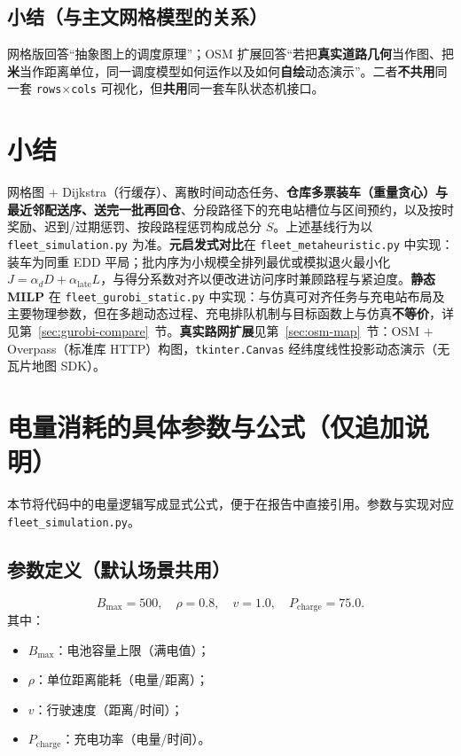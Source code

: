 \documentclass[UTF8,a4paper]{ctexart}
\begin{document}
\subsection{小结（与主文网格模型的关系）}

网格版回答“抽象图上的调度原理”；OSM 扩展回答“若把\textbf{真实道路几何}当作图、把\textbf{米}当作距离单位，同一调度模型如何运作以及如何\textbf{自绘}动态演示”。二者\textbf{不共用}同一套 \texttt{rows}$\times$\texttt{cols} 可视化，但\textbf{共用}同一套车队状态机接口。

\section{小结}
\label{sec:summary}

网格图 $+$ Dijkstra（行缓存）、离散时间动态任务、\textbf{仓库多票装车（重量贪心）与最近邻配送序、送完一批再回仓}、分段路径下的充电站槽位与区间预约，以及按时奖励、迟到/过期惩罚、按段路程惩罚构成总分 $S$。上述基线行为以 \texttt{fleet\_simulation.py} 为准。\textbf{元启发式对比}在 \texttt{fleet\_metaheuristic.py} 中实现：装车为同重 EDD 平局；批内序为小规模全排列最优或模拟退火最小化 $J=\alpha_{d}D+\alpha_{\mathrm{late}}L$，与得分系数对齐以便改进访问序时兼顾路程与紧迫度。\textbf{静态 MILP} 在 \texttt{fleet\_gurobi\_static.py} 中实现：与仿真可对齐任务与充电站布局及主要物理参数，但在多趟动态过程、充电排队机制与目标函数上与仿真\textbf{不等价}，详见第~\ref{sec:gurobi-compare}~节。\textbf{真实路网扩展}见第~\ref{sec:osm-map}~节：OSM $+$ Overpass（标准库 HTTP）构图，\texttt{tkinter.Canvas} 经纬度线性投影动态演示（无瓦片地图 SDK）。

\section{电量消耗的具体参数与公式（仅追加说明）}
\label{sec:energy-detail}

本节将代码中的电量逻辑写成显式公式，便于在报告中直接引用。参数与实现对应 \texttt{fleet\_simulation.py}。

\subsection{参数定义（默认场景共用）}
\[
  B_{\max}=500,\quad
  \rho=0.8,\quad
  v=1.0,\quad
  P_{\mathrm{charge}}=75.0.
\]
其中：
\begin{itemize}
  \item $B_{\max}$：电池容量上限（满电值）；
  \item $\rho$：单位距离能耗（电量/距离）；
  \item $v$：行驶速度（距离/时间）；
  \item $P_{\mathrm{charge}}$：充电功率（电量/时间）。
\end{itemize}
\end{document}
